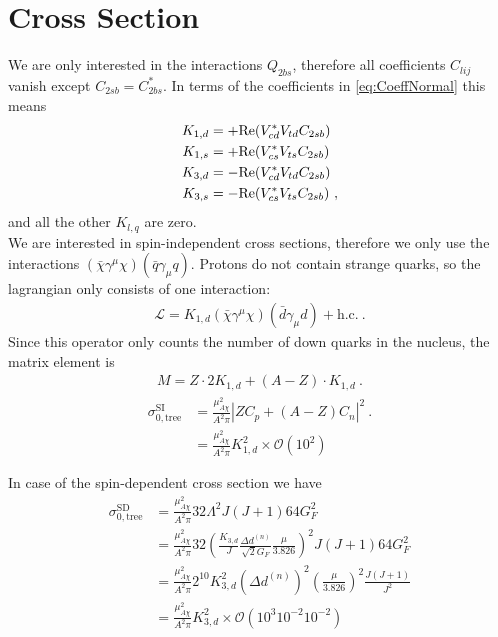 \section{Cross Section}
We are only interested in the interactions $Q_{2bs}$, therefore all coefficients $C_{lij}$ vanish except $C_{2sb} = C_{2bs}^*$. In terms of the coefficients in \eqref{eq:CoeffNormal} this means
\begin{align}
	K_{1,d} &= +\text{Re}(V_{cd}^*V_{td}C_{2sb})\notag \\
	K_{1,s} &= +\text{Re}(V_{cs}^*V_{ts}C_{2sb})\notag \\
	K_{3,d} &= -\text{Re}(V_{cd}^*V_{td}C_{2sb})\notag \\
	K_{3,s} &= -\text{Re}(V_{cs}^*V_{ts}C_{2sb}) \ ,
\end{align}
and all the other $K_{l,q}$ are zero. \\
We are interested in spin-independent cross sections, therefore we only use the interactions $(\bar{\chi}\gamma^\mu\chi)(\bar{q}\gamma_\mu q)$. Protons do not contain strange quarks, so the lagrangian only consists of one interaction:
\begin{align}
	\mathcal{L} = K_{1,d}(\bar{\chi}\gamma^\mu\chi)(\bar{d}\gamma_\mu d) + \text{h.c.} \ .
\end{align}
Since this operator only counts the number of down quarks in the nucleus, the matrix element is
\begin{align}
	M = Z\cdot 2K_{1,d} + (A-Z)\cdot K_{1,d} \ .
\end{align}
\begin{align}
	\sigma_{0,\text{tree}}^\text{SI} &= \frac{\mu_{A\chi}^2}{A^2\pi}\left|ZC_p +(A-Z)C_n\right|^2 \ . \\
	&= \frac{\mu_{A\chi}^2}{A^2\pi}K_{1,d}^2\times\mathcal{O}(10^2)
\end{align}



In case of the spin-dependent cross section we have
\begin{align}
	\sigma_{0,\text{tree}}^\text{SD} &= \frac{\mu_{A\chi}^2}{A^2\pi}32\Lambda^2J(J+1)64G_F^2 \\
	&= \frac{\mu_{A\chi}^2}{A^2\pi}32\left(\frac{K_{3,d}}{J}\frac{\Delta d^{(n)}}{\sqrt{2}G_F}\frac{\mu}{3.826}\right)^2J(J+1)64G_F^2 \\
	&= \frac{\mu_{A\chi}^2}{A^2\pi}2^{10}K_{3,d}^2(\Delta d^{(n)})^2\left(\frac{\mu}{3.826}\right)^2\frac{J(J+1)}{J^2} \\
	&= \frac{\mu_{A\chi}^2}{A^2\pi}K_{3,d}^2\times\mathcal{O}(10^{3}10^{-2}10^{-2})
\end{align}

